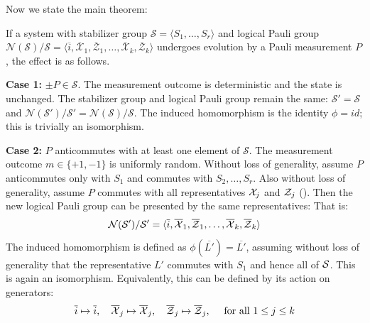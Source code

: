 Now we state the main theorem:

\begin{theorem}\label{thm:logical_pauli_group_update_measurement}
    \cite[Theorem 6.6]{gottesman2024surviving} If a system with stabilizer group $\mathcal{S} = \langle S_1, \ldots, S_r \rangle$ and logical Pauli group $\mathcal{N}(\mathcal{S})/\mathcal{S} = \langle \overline{i}, \overline{\mathcal{X}}_1, \overline{\mathcal{Z}}_1, \ldots, \overline{\mathcal{X}}_k, \overline{\mathcal{Z}}_k \rangle$ undergoes evolution by a Pauli measurement $P$, the effect is as follows.

    \textbf{Case 1:}\label{thm:logical_pauli_group_update_measurement:case1} $\pm P \in \mathcal{S}$.
    The measurement outcome is deterministic and the state is unchanged.
    The stabilizer group and logical Pauli group remain the same: $\mathcal{S}' = \mathcal{S}$ and $\mathcal{N}(\mathcal{S}')/\mathcal{S}' = \mathcal{N}(\mathcal{S})/\mathcal{S}$.
    The induced homomorphism is the identity $\phi = id$; this is trivially an isomorphism.


    \textbf{Case 2:}\label{thm:logical_pauli_group_update_measurement:case2} $P$ anticommutes with at least one element of $\mathcal{S}$.
    The measurement outcome $m \in \{+1, -1\}$ is uniformly random.
    Without loss of generality, assume $P$ anticommutes only with $S_1$ and commutes with $S_2, \ldots, S_r$.
    Also without loss of generality, assume $P$ commutes with all representatives $\mathcal{X}_j$ and $\mathcal{Z}_j$ ().
    Then the new logical Pauli group can be presented by the same representatives:
    That is:
    \begin{equation}
        \mathcal{N}(\mathcal{S}')/\mathcal{S}' = \langle \overline{i}, \overline{\mathcal{X}}_1, \overline{\mathcal{Z}}_1, \ldots, \overline{\mathcal{X}}_k, \overline{\mathcal{Z}}_k \rangle
    \end{equation}
    The induced homomorphism is defined as $\phi(\overline{L'}) = \overline{L'}$, assuming without loss of generality that the representative $L'$ commutes with $S_1$ and hence all of $\mathcal{S}$.
    This is again an isomorphism.
    Equivalently, this can be defined by its action on generators:
    \begin{equation}
        \overline{i} \mapsto \overline{i}, \quad
        \overline{\mathcal{X}}_j \mapsto \overline{\mathcal{X}}_j, \quad
        \overline{\mathcal{Z}}_j \mapsto \overline{\mathcal{Z}}_j, \quad
        \text { for all $1 \leq j \leq k$}
    \end{equation}


\end{theorem}
